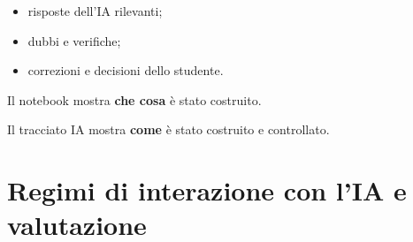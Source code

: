 \documentclass[handout]{beamer}%
\providecommand{\1}{\mathbf{1}}
\begin{document}
\begin{frame}
\begin{description}
\begin{itemize}
\item risposte dell'IA rilevanti;

\item dubbi e verifiche;

\item correzioni e decisioni dello studente.

\end{itemize}

\end{description}

\vspace{0.1cm}

Il notebook mostra \textbf{che cosa} \`e stato costruito.

Il tracciato IA mostra \textbf{come} \`e stato costruito e controllato.

\transboxout%
\end{frame}%


\section{Regimi di interazione con l'IA e valutazione}

\end{document}
